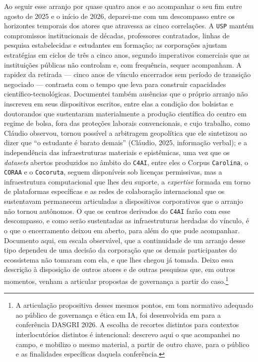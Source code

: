 Ao seguir esse arranjo por quase quatro anos e ao acompanhar o seu fim entre agosto de 2025 e o início de 2026, deparei-me com um descompasso entre os horizontes temporais dos atores que atravessa as cinco correlações. A \texttt{USP} mantém compromissos institucionais de décadas, professores contratados, linhas de pesquisa estabelecidas e estudantes em formação; as corporações ajustam estratégias em ciclos de três a cinco anos, segundo imperativos comerciais que as instituições públicas não controlam e, com frequência, sequer acompanham. A rapidez da retirada --- cinco anos de vínculo encerrados sem período de transição negociado --- contrasta com o tempo que leva para construir capacidades científico-tecnológicas. Documentei também ausências que o próprio arranjo não inscreveu em seus dispositivos escritos, entre elas a condição dos bolsistas e doutorandos que sustentaram materialmente a produção científica do centro em regime de bolsa, fora das proteções laborais convencionais, e cujo trabalho, como Cláudio observou, tornou possível a arbitragem geopolítica que ele sintetizou ao dizer que \enquote{o estudante é barato demais} (Cláudio, 2025, informação verbal); e a independência das infraestruturas materiais e epistêmicas, uma vez que os \emph{datasets} abertos produzidos no âmbito do \texttt{C4AI}, entre eles o Corpus \texttt{Carolina}, o \texttt{CORAA} e o \texttt{Cocoruta}, seguem disponíveis sob licenças permissivas, mas a infraestrutura computacional que lhes deu suporte, a \emph{expertise} formada em torno de plataformas específicas e as redes de colaboração internacional que os sustentavam permanecem articuladas a dispositivos corporativos que o arranjo não tornou autônomos. O que os centros derivados do \texttt{C4AI} farão com esse descompasso, e como serão sustentadas as infraestruturas herdadas do vínculo, é o que o encerramento deixou em aberto, para além do que pude acompanhar. Documento aqui, em escala observável, que a continuidade de um arranjo desse tipo dependeu de uma decisão da corporação que os demais participantes do ecossistema não tomaram com ela, e que lhes chegou já tomada. Deixo essa descrição à disposição de outros atores e de outras pesquisas que, em outros momentos, venham a articular propostas de governança a partir do caso.\footnote{A articulação propositiva desses mesmos pontos, em tom normativo adequado ao público de governança e ética em IA, foi desenvolvida em \parencite{Helanski2026DASGRI} para a conferência DASGRI 2026. A escolha de recortes distintos para contextos interlocutórios distintos é intencional: descrevo aqui o que acompanhei no campo, e mobilizo o mesmo material, a partir de outro chave, para o público e as finalidades específicas daquela conferência.}

